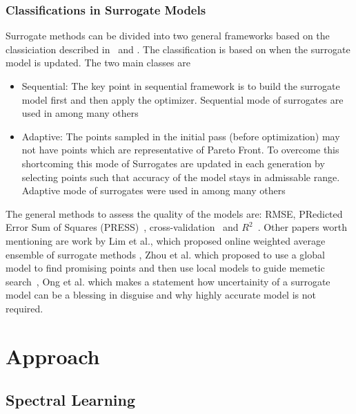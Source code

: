 \documentclass{newsig}
\begin{document}
\subsubsection{Classifications in Surrogate Models}
Surrogate methods can be divided into two general frameworks based on the classiciation described in~\cite{wang2007review} and \cite{liu2008novel}. The classification is based on when the surrogate model is updated. The two main classes are 
\begin{itemize}
\item{Sequential: The key point in sequential framework is to build the surrogate model first and then apply the optimizer. Sequential mode of surrogates are used in \cite{goel2007response, queipo2005surrogate, wilson2001efficient, liao2008multiobjective, su2011multi} among many others}

\item{Adaptive: The points sampled in the initial pass (before optimization) may not have points which are representative of Pareto Front. To overcome this shortcoming this mode of Surrogates are updated in each generation by selecting points such that accuracy of the model stays in admissable range. Adaptive mode of surrogates were used in \cite{zhou2007adaptive, gobbi2014local, khokhar2010performance, chen2012efficient} among many others}
\end{itemize}
The general methods to assess the quality of the models are: RMSE, PRedicted Error Sum of
Squares (PRESS)~\cite{kutner2004applied}, cross-validation~\cite{shan2010survey} and $R^2$~\cite{li2010systematic}. Other papers worth mentioning are work by Lim et al., which proposed online weighted average ensemble of surrogate methods  \cite{lim2010generalizing}, Zhou et al. which proposed to use a global model to find promising points and then use local models to guide memetic search~\cite{zhou2007combining}, Ong et al. which makes a statement how uncertainity of a surrogate model can be a blessing in disguise and why highly accurate model is not required.




 
 \section{Approach}

\subsection{Spectral Learning}\label{sect:spect}
\end{document}

